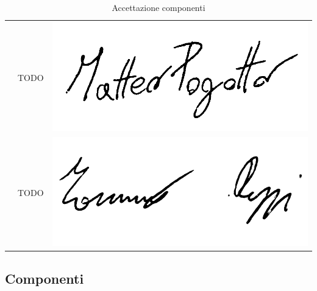 \begin{table}[H]
\begin{center}
\begin{tabular}{ c c c}
				\Matteo{} & TODO & \includegraphics[scale = 0.12]{components/img/firme_membri/firma-mp.png} \\
				\Tommaso{} & TODO & \includegraphics[scale = 0.5]{components/img/firme_membri/firma-tp.png} \\
				
				\bottomrule
			\end{tabular}
			\caption{Accettazione componenti}
		\end{center}
    \end{table}

\subsection{Componenti}

